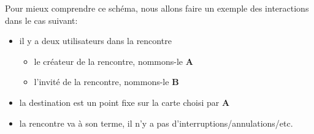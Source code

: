 \documentclass[french]{article}
\begin{document}
	Pour mieux comprendre ce schéma, nous allons faire un exemple des interactions dans le cas suivant:
	\begin{itemize}
		\item il y a deux utilisateurs dans la rencontre
		\begin{itemize}
			\item le créateur de la rencontre, nommons-le \textbf{A}
			\item l'invité de la rencontre, nommons-le \textbf{B}
		\end{itemize}
		\item la destination est un point fixe sur la carte choisi par \textbf{A}
		\item la rencontre va à son terme, il n'y a pas d'interruptions/annulations/etc.
	\end{itemize}
\end{document}
